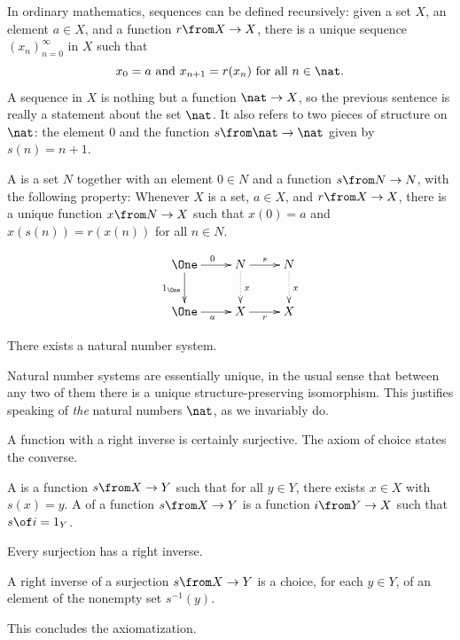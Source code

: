 \documentclass[12pt]{article}
\begin{document}
% 
In ordinary mathematics, sequences can be defined recursively: given a set
$X$, an element $a \in X$, and a function $r \from X \to X$, there is a
unique sequence $(x_n)_{n = 0}^\infty$ in $X$ such that
\[
x_0 = a
\text{ and }
x_{n + 1} = r(x_n) 
\text{ for all } n \in \nat.
\]
A sequence in $X$ is nothing but a function $\nat \to X$, so the previous
sentence is really a statement about the set $\nat$.  It also refers to two
pieces of structure on $\nat$: the element $0$ and the function $s\from
\nat \to \nat$ given by $s(n) = n + 1$.

\begin{dfn}
A  is a set $N$ together with an
element $0 \in N$ and a function $s\from N \to N$, with the
following property:
\medskip\noindent
Whenever $X$ is a set, $a \in X$, and $r\from X \to X$,
there is a unique function $x\from N \to X$ such that
$x(0) = a$
and 
$x(s(n)) = r(x(n))$ for all $n \in N$.
\end{dfn}
\[
\xymatrix{
\One \ar[r]^0 \ar[d]_{1_{\One}} &N \ar[r]^s \ar@{.>}[d]^x
                                                &N \ar@{.>}[d]^x        \\
\One \ar[r]_a                   &X \ar[r]_r     &X
}
\]
% 
\begin{axiom}
There exists a natural number system.
\end{axiom}
Natural number systems are essentially unique, in the usual sense that
between any two of them there is a unique structure-preserving isomorphism.
This justifies speaking of \emph{the} natural numbers $\nat$, as we
invariably do.


% 
A function with a right inverse is certainly surjective.  The axiom of
choice states the converse.

\begin{dfn}
A  is a function $s \from X \to Y$ such that for all $y
\in Y$, there exists $x \in X$ with $s(x) = y$. A  of a function $s\from X \to Y$ is a function
$i\from Y \to X$ such that $s \of i = 1_Y$.
\end{dfn}

\begin{axiom}
Every surjection has a right inverse.
\end{axiom}

A right inverse of a surjection $s\from X \to Y$ is a choice, for each $y \in
Y$, of an element of the nonempty set $s^{-1}(y)$.  

This concludes the axiomatization.
\end{document}
